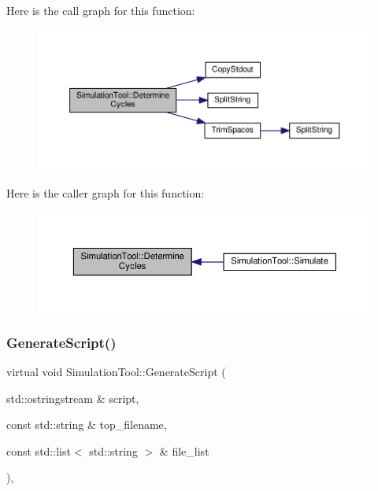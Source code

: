 Here is the call graph for this function\+:
\nopagebreak
\begin{figure}[H]
\begin{center}
\leavevmode
\includegraphics[width=350pt]{d5/dfc/classSimulationTool_a8e8df618d62095f1f87bc4b61282c563_cgraph}
\end{center}
\end{figure}
Here is the caller graph for this function\+:
\nopagebreak
\begin{figure}[H]
\begin{center}
\leavevmode
\includegraphics[width=350pt]{d5/dfc/classSimulationTool_a8e8df618d62095f1f87bc4b61282c563_icgraph}
\end{center}
\end{figure}
\mbox{\label{classSimulationTool_afd99529bb7adb46081071097ceae7643}} 
\subsubsection{\texorpdfstring{Generate\+Script()}{GenerateScript()}}
{\footnotesize\ttfamily virtual void Simulation\+Tool\+::\+Generate\+Script (\begin{DoxyParamCaption}\item[{std\+::ostringstream \&}]{script,  }\item[{const std\+::string \&}]{top\+\_\+filename,  }\item[{const std\+::list$<$ std\+::string $>$ \&}]{file\+\_\+list }\end{DoxyParamCaption})\hspace{0.3cm}{\ttfamily [protected]}, {}}




